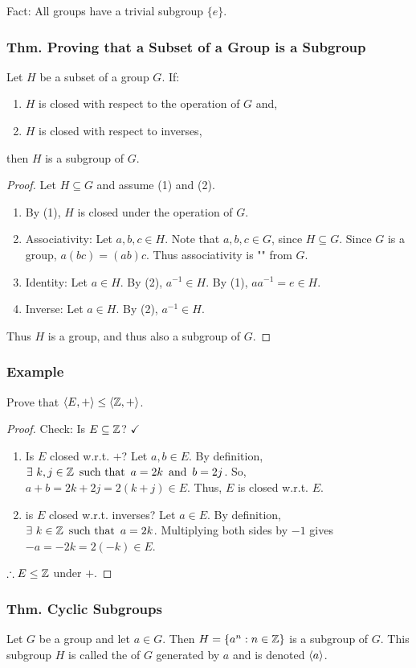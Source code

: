 Fact: All groups have a trivial subgroup $\{e\}$.

\subsubsection{Thm. Proving that a Subset of a Group is a Subgroup}
Let $H$ be a subset of a group $G$. If:
\begin{enumerate}
    \item $H$ is closed with respect to the operation of $G$ and,
    \item $H$ is closed with respect to inverses,
\end{enumerate}
then $H$ is a subgroup of $G$.
\begin{proof}
    Let $H \subseteq G$ and assume (1) and (2).
    \begin{enumerate}
        \item By (1), $H$ is closed under the operation of $G$.
        \item Associativity: Let $a,b,c \in H$. Note that $a,b,c \in G$, since $H \subseteq G$. Since $G$ is a group, $a(bc) = (ab)c$. Thus associativity is "" from $G$.
        \item Identity: Let $a \in H$. By (2), $a^{-1} \in H$. By (1), $aa^{-1} = e \in H$.
        \item Inverse: Let $a \in H$. By (2), $a^{-1} \in H$.
    \end{enumerate}
    Thus $H$ is a group, and thus also a subgroup of $G$.
\end{proof}

\subsubsection*{Example}
Prove that $\langle E,+ \rangle \leq \langle \mathbb{Z},+ \rangle$.
\begin{proof}
    Check: Is $E \subseteq \mathbb{Z}$? $\checkmark$
    \begin{enumerate}
        \item Is $E$ closed w.r.t. $+$?
        Let $a,b \in E$. By definition, $\exists~k,j \in \mathbb{Z} \operatorname{~\text{such that}~} a = 2k \operatorname{~\text{and}~} b = 2j$. So, $a+b = 2k+2j = 2(k+j) \in E$. Thus, $E$ is closed  w.r.t. $E$.
        \item is $E$ closed w.r.t. inverses?
        Let $a \in E$. By definition, $\exists~k \in \mathbb{Z} \operatorname{~\text{such that}~} a = 2k$. Multiplying both sides by $-1$ gives $-a = -2k = 2(-k) \in E$.
    \end{enumerate}
    $\therefore E \leq \mathbb{Z}$ under $+$.
\end{proof}

\subsubsection{Thm. Cyclic Subgroups}
Let $G$ be a group and let $a \in G$. Then $H = \{a^n : n \in \mathbb{Z}\}$ is a subgroup of $G$. This subgroup $H$ is called the  of $G$ generated by $a$ and is denoted $\langle a \rangle$.